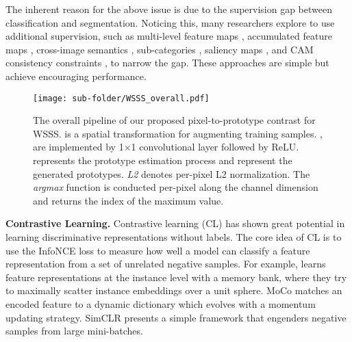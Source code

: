\documentclass[10pt,twocolumn,letterpaper]{article}
\begin{document}
The inherent reason for the above issue is due to the supervision gap between classification and segmentation.
Noticing this, many researchers explore to use additional supervision, such as multi-level feature maps \cite{kim2016deconvolutionalmulti-feature}, accumulated feature maps \cite{jiang2019integralOAA}, cross-image semantics \cite{fan2020cianCIAN, sun2020miningcrossimage}, sub-categories \cite{chang2020weaklySubCategory}, saliency maps \cite{yao2020saliency2, lee2021railroadEPS}, and CAM consistency constraints \cite{wang2020selfSEAM}, to narrow the gap.
These approaches are simple but achieve encouraging performance.



\begin{figure*}[htp]
\centering
\begin{center}
\texttt{[image: sub-folder/WSSS\_overall.pdf]}
\end{center}
\caption{The overall pipeline of our proposed pixel-to-prototype contrast for WSSS.  is a spatial transformation for augmenting training samples. ,  are implemented by 1×1 convolutional layer followed by ReLU.  represents the prototype estimation process and  represent the generated prototypes. \textit{L2} denotes per-pixel L2 normalization. The \textit{argmax} function is conducted per-pixel along the channel dimension and returns the index of the maximum value.}
\label{overall}
\end{figure*}

\noindent \textbf{Contrastive Learning.}
Contrastive learning (CL) \cite{jaiswal2021CLsurvey1} has shown great potential in learning discriminative representations without labels.
The core idea of CL is to use the InfoNCE loss \cite{oord2018representationCPC_INFONCE} to measure how well a model can classify a feature representation from a set of unrelated negative samples.
For example, \cite{wu2018unsupervisedMemoryBank} learns feature representations at the instance level with a memory bank, where they try to maximally scatter instance embeddings over a unit sphere. 
MoCo \cite{he2020momentumMOCOv1} matches an encoded feature to a dynamic dictionary which evolves with a momentum updating strategy. 
SimCLR \cite{chen2020simpleSIMCLR} presents a simple framework that engenders negative samples from large mini-batches.
\end{document}
